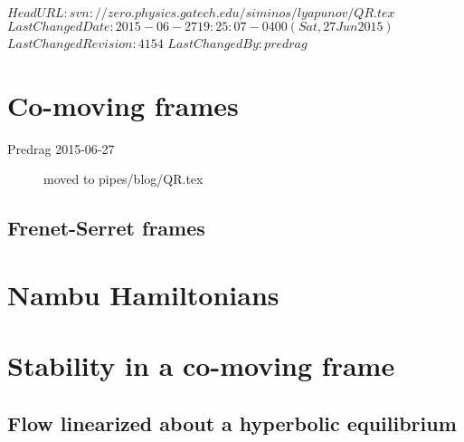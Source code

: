 \ifsvnmulti
 \svnidlong
 {$HeadURL: svn://zero.physics.gatech.edu/siminos/lyapunov/QR.tex $}
 {$LastChangedDate: 2015-06-27 19:25:07 -0400 (Sat, 27 Jun 2015) $}
 {$LastChangedRevision: 4154 $} {$LastChangedBy: predrag $}
\fi

\renewcommand{\ssp}{x}            %

\section{Co-moving frames}
\label{c:comoving}

\begin{description}

\item[Predrag 2015-06-27]
moved to  pipes/blog/QR.tex
\end{description}


\subsection{Frenet-Serret frames}
\label{sect:FrenSerr}

\section{Nambu Hamiltonians}
\label{sect:Nambu}

\section{Stability in a co-moving frame}
\label{sect:stabComoving}

\subsection{Flow linearized about a hyperbolic equilibrium}

